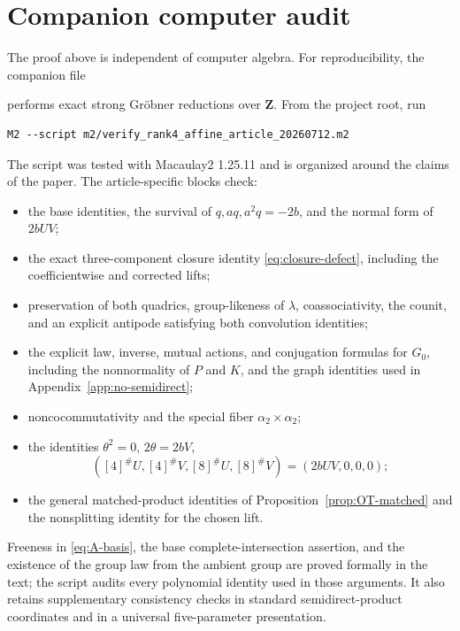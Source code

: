 \documentclass[11pt]{amsart}
\theoremstyle{remark}
\newcommand{\Z}{\mathbf Z}
\begin{document}
\section{Companion computer audit}
\label{app:audit}

The proof above is independent of computer algebra.  For reproducibility,
the companion file
\begin{center}
\end{center}
performs exact strong Gr\"obner reductions over \(\Z\).  From the project
root, run
\begin{verbatim}
M2 --script m2/verify_rank4_affine_article_20260712.m2
\end{verbatim}
The script was tested with Macaulay2 1.25.11 and is organized around the
claims of the paper.  The article-specific blocks check:
\begin{itemize}
\item the base identities, the survival of \(q,aq,a^2q=-2b\), and the
normal form of \(2bUV\);
\item the exact three-component closure identity
\eqref{eq:closure-defect}, including the coefficientwise and corrected
lifts;
\item preservation of both quadrics, group-likeness of \(\lambda\),
coassociativity, the counit, and an explicit antipode satisfying both
convolution identities;
\item the explicit law, inverse, mutual actions, and conjugation formulas
for \(G_0\), including the nonnormality of \(P\) and \(K\), and the
graph identities used in Appendix~\ref{app:no-semidirect};
\item noncocommutativity and the special fiber
\(\alpha_2\times\alpha_2\);
\item the identities \(\theta^2=0\), \(2\theta=2bV\),
\[
 ([4]^\#U,[4]^\#V,[8]^\#U,[8]^\#V)=(2bUV,0,0,0);
\]
\item the general matched-product identities of
Proposition~\ref{prop:OT-matched} and the nonsplitting identity for the
chosen lift.
\end{itemize}
Freeness in \eqref{eq:A-basis}, the base complete-intersection assertion,
and the existence of the group law from the ambient group are proved
formally in the text; the script audits every polynomial identity used
in those arguments.  It also retains supplementary consistency checks
in standard semidirect-product coordinates and in a universal
five-parameter presentation.
\end{document}
